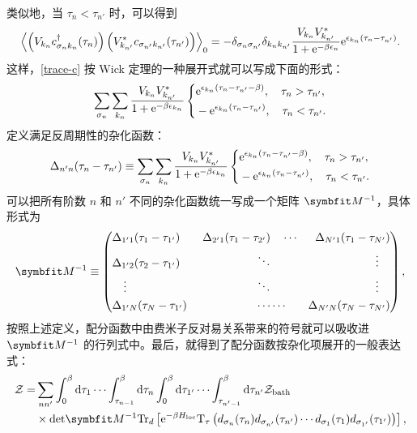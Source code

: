 类似地，当 $\tau_n<\tau_{n'}$ 时，可以得到
\begin{equation}
    \left\langle\left( V_{k_n}c_{\sigma_n k_n}^\dagger (\tau_n) \right) \left( V_{k_{n'}}^* c_{\sigma_{n'}k_{n'}}(\tau_{n'}) \right)\right\rangle_0=-\delta_{\sigma_n\sigma_{n'}}\delta_{k_nk_{n'}}\frac{V_{k_n}V_{k_{n'}}^*}{1+\mathrm{e}^{-\beta\epsilon_n}}\mathrm{e}^{\epsilon_{k_n}(\tau_n-\tau_{n'})}.
\end{equation}
这样，\eqref{trace-c} 按 Wick 定理的一种展开式就可以写成下面的形式：
\begin{equation}
    \sum_{\sigma_n}\sum_{k_n}\frac{V_{k_n}V_{k_{n'}}^*}{1+\mathrm{e}^{-\beta \epsilon_{k_n}}}\left\{
        \begin{aligned}
            &\mathrm{e}^{\epsilon_{k_n}(\tau_n-\tau_{n'}-\beta)},\quad \tau_n>\tau_{n'},\\
            &-\mathrm{e}^{\epsilon_{k_n}(\tau_n-\tau_{n'})},\quad \tau_n<\tau_{n'}.
        \end{aligned}
    \right.
\end{equation}
定义满足反周期性的杂化函数： 
\begin{equation}
    \Delta_{n'n}(\tau_n-\tau_{n'})\equiv\sum_{\sigma_n}\sum_{k_n}\frac{V_{k_n}V_{k_{n'}}^*}{1+\mathrm{e}^{-\beta \epsilon_{k_n}}}\left\{
        \begin{aligned}
            &\mathrm{e}^{\epsilon_{k_n}(\tau_n-\tau_{n'}-\beta)},\quad \tau_n>\tau_{n'},\\
            &-\mathrm{e}^{\epsilon_{k_n}(\tau_n-\tau_{n'})},\quad \tau_n<\tau_{n'}.
        \end{aligned}
    \right.
\end{equation}
可以把所有阶数 $n$ 和 $n'$ 不同的杂化函数统一写成一个矩阵 $\vct{M}^{-1}$，具体形式为 
\begin{equation}
    \vct{M}^{-1}\equiv 
    \left(
        \begin{aligned}
            &\Delta_{1'1}(\tau_1-\tau_{1'})\quad&\Delta_{2'1}(\tau_1-\tau_{2'})&\quad\cdots &\Delta_{N'1}(\tau_1-\tau_{N'})\\
            &\Delta_{1'2}(\tau_2-\tau_{1'})&\ddots&&\vdots\quad\\
            &\quad\vdots&\ddots&&\vdots\quad\\
            &\Delta_{1'N}(\tau_N-\tau_{1'})&\cdots &\cdots &\Delta_{N'N}(\tau_N-\tau_{N'})
        \end{aligned}
    \right),
\end{equation}
按照上述定义，配分函数中由费米子反对易关系带来的符号就可以吸收进 $\vct{M}^{-1}$ 的行列式中。最后，就得到了配分函数按杂化项展开的一般表达式： 
\begin{equation}
    \begin{aligned}
        \mathcal{Z}=&\sum_{nn'}\int_{0}^\beta \dd\tau_1\cdots\int_{\tau_{n-1}}^\beta \dd\tau_n\int_0^\beta\dd\tau_{1'}\cdots\int_{\tau_{n'-1}}^\beta\dd\tau_{n'}\mathcal{Z}_{\fun{bath}}\\
        &\times \fun{det}\vct{M}^{-1}\fun{Tr}_d\lmi \e^{-\beta H_{\fun{loc}}}\fun{T}_\tau \ls d_{\sigma_n}(\tau_n)d_{\sigma_{n'}}(\tau_{n'})\cdots d_{\sigma_1}(\tau_1)d_{\sigma_{1'}}(\tau_{1'}) \rs \rmi,
    \end{aligned}
\end{equation}
